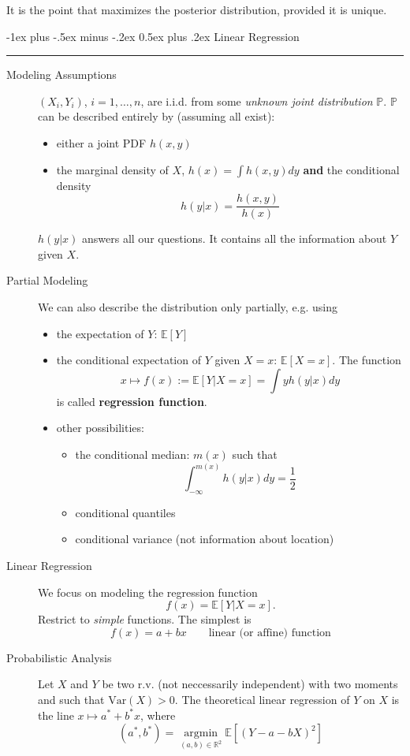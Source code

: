 \documentclass[a4paper, 10pt,landscape]{article}
\makeatletter
\DeclareMathOperator*{\argmin}{argmin}
\newcommand{\var}{\textrm{Var}}
\renewcommand{\section}{\@startsection{section}{1}{0mm}%
                                {-1ex plus -.5ex minus -.2ex}%
                                {0.5ex plus .2ex}%
                                {\normalfont\large\bfseries}}
\makeatother
\begin{document}
\begin{multicols*}{3}
\begin{description}
\begin{itemize}
		It is the point that maximizes the posterior distribution, provided it is unique.
	\end{itemize}
\end{description}

\section{Linear Regression}\smallskip \hrule height 1pt \smallskip

\begin{description}
	\item [Modeling Assumptions] $\left(X_i,Y_i\right)$, $i=1,\dots,n$, are i.i.d. from some {\it unknown joint distribution} $\mathbb{P}$. $\mathbb{P}$ can be described entirely by (assuming all exist):
	\begin{itemize}
		\item either a joint PDF $h(x,y)$
		\item the marginal density of $X$, $h(x)=\int h(x,y)dy$ {\bf and} the conditional density $$h(y|x)=\dfrac{h(x,y)}{h(x)}$$
	\end{itemize}
	$h(y|x)$ answers all our questions. It contains all the information about $Y$ given $X$.
	\item [Partial Modeling] We can also describe the distribution only partially, e.g. using
	\begin{itemize}
		\item the expectation of $Y$: $\mathbb{E}\left[Y\right]$
		\item the conditional expectation of $Y$ given $X=x$: $\mathbb{E}\left[X=x\right]$. The function $$x\mapsto f(x):=\mathbb{E}\left[Y|X=x\right]=\int yh(y|x)dy$$ is called {\bf regression function}.
		\item other possibilities:
		\begin{itemize}[noitemsep]
			\item the conditional median: $m(x)$ such that $$\int_{-\infty}^{m(x)}h(y|x)dy=\frac{1}{2}$$
			\item conditional quantiles
			\item conditional variance (not information about location)
		\end{itemize}
	\end{itemize}
	\item[Linear Regression] We focus on modeling the regression function
	$$f(x)=\mathbb{E}\left[Y\rvert X=x\right].$$
	Restrict to {\it simple} functions. The simplest is
	$$f(x)=a+bx\qquad\text{linear (or affine) function}$$
	\item[Probabilistic Analysis] Let $X$ and $Y$ be two r.v. (not neccessarily independent) with two moments and such that $\var\left(X\right)>0.$ The theoretical linear regression of $Y$ on $X$ is the line $x\mapsto a^*+b^*x$, where $$\left(a^*,b^*\right)=\argmin\limits_{(a,b)\in\mathbb{R}^2}\mathbb{E}\left[\left(Y-a-bX\right)^2\right]$$

\end{description}
\end{multicols*}
\end{document}
